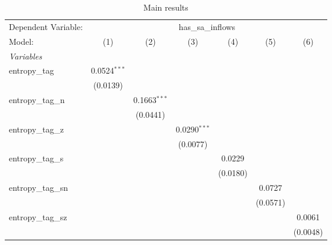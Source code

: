 
\begin{table}[htbp]
   \centering
   \footnotesize
   \begin{threeparttable}[b]
      \caption{\label{tab:reg_has_sa_inflows_tag.tex} Main results}
      \begin{tabular}{lcccccc}
         \tabularnewline \midrule \midrule
         Dependent Variable: & \multicolumn{6}{c}{has\_sa\_inflows}\\
         Model:              & (1)            & (2)            & (3)            & (4)            & (5)            & (6)\\  
         \midrule
         \emph{Variables}\\
         entropy\_tag        & 0.0524$^{***}$ &                &                &                &                &   \\   
                             & (0.0139)       &                &                &                &                &   \\   
         entropy\_tag\_n     &                & 0.1663$^{***}$ &                &                &                &   \\   
                             &                & (0.0441)       &                &                &                &   \\   
         entropy\_tag\_z     &                &                & 0.0290$^{***}$ &                &                &   \\   
                             &                &                & (0.0077)       &                &                &   \\   
         entropy\_tag\_s     &                &                &                & 0.0229         &                &   \\   
                             &                &                &                & (0.0180)       &                &   \\   
         entropy\_tag\_sn    &                &                &                &                & 0.0727         &   \\   
                             &                &                &                &                & (0.0571)       &   \\   
         entropy\_tag\_sz    &                &                &                &                &                & 0.0061\\   
                             &                &                &                &                &                & (0.0048)\\   

\end{tabular}
\end{threeparttable}
\end{table}
